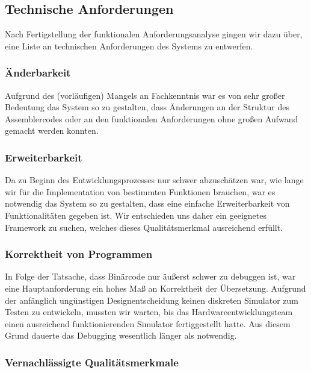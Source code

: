 \documentclass[paper=a4,fontsize=12pt,twocolumn]{scrreprt}
\begin{document}
\subsection{Technische Anforderungen}
\label{subsec:technische_anforderungen}

Nach Fertigstellung der funktionalen Anforderungsanalyse gingen wir dazu über, eine Liste an technischen Anforderungen des Systems zu entwerfen.

\subsubsection{Änderbarkeit}

Aufgrund des (vorläufigen) Mangels an Fachkenntnis war es von sehr großer Bedeutung das System so zu gestalten, dass Änderungen an der Struktur des Assemblercodes oder an den funktionalen Anforderungen ohne großen Aufwand gemacht werden konnten.

\subsubsection{Erweiterbarkeit}

Da zu Beginn des Entwicklungsprozesses nur schwer abzuschätzen war, wie lange wir für die Implementation von bestimmten Funktionen brauchen, war es notwendig das System so zu gestalten, dass eine einfache Erweiterbarkeit von Funktionalitäten gegeben ist.
Wir entschieden uns daher ein geeignetes Framework zu suchen, welches dieses Qualitätsmerkmal ausreichend erfüllt. 

\subsubsection{Korrektheit von Programmen}

In Folge der Tatsache, dass Binärcode nur äußerst schwer zu debuggen ist, war eine Hauptanforderung ein hohes Maß an Korrektheit der Übersetzung.
Aufgrund der anfänglich ungünstigen Designentscheidung keinen diskreten Simulator zum Testen zu entwickeln, mussten wir warten, bis das Hardwareentwicklungsteam einen ausreichend funktionierenden Simulator fertiggestellt hatte.
Aus diesem Grund dauerte das Debugging wesentlich länger als notwendig.

\subsubsection{Vernachlässigte Qualitätsmerkmale}
\end{document}
